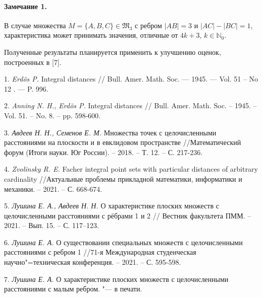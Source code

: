 \paragraph{Замечание 1.}
В случае множества $M=\{A, B, C\} \in \mathfrak{M}_{3}$ с ребром $|AB|=3$ и $|AC|-|BC|=1$, характеристика может принимать значения, отличные от $4k+3$, $k\in\mathbb{N}_{0}$.

Полученные результаты планируется применить к улучшению оценок, построенных в [7].

\litlist


1. {\it Erdös P.}
Integral distances // Bull. Amer. Math. Soc. — 1945. — Vol. 51 -- No 12 . — P. 996.

2. {\it Anning N. H., Erdös P. }
Integral distances // Bull. Amer. Math. Soc. – 1945. – Vol. 51. – No. 8. – pp. 598-600.


3. {\it Авдеев Н. Н., Семенов Е. М.}
Множества точек с целочисленными расстояниями на плоскости и в евклидовом пространстве //Математический форум (Итоги науки. Юг России). – 2018. – Т. 12. – С. 217-236.

4. \foreignlanguage{english}{{\it Zvolinsky R. E.}
Facher integral point sets with particular distances of arbitrary cardinality} //Актуальные проблемы прикладной математики, информатики и механики. – 2021. – С. 668-674.

5. {\it Лушина Е. А., Авдеев Н. Н.}
О характеристике плоских множеств с целочисленными
расстояниями с рёбрами 1 и 2 // Вестник факультета ПММ. – 2021. – Вып. 15. – С.
117–123.

6. {\it Лушина Е. А.}
О существовании специальных множеств с целочисленными расстояниями с ребром 1 //71-я Международная студенческая научно"=техническая конференция. – 2021. – С. 595-598.

7. {\it Лушина Е. А.}
О характеристике плоских множеств с целочисленными расстояниями с малым ребром. "--- в печати.
